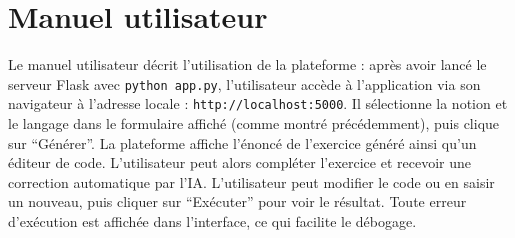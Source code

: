 \documentclass[a4paper, 12pt, twoside]{article}
\begin{document}
	\section{Manuel utilisateur}
Le manuel utilisateur décrit l'utilisation de la plateforme : après avoir lancé le serveur Flask avec \texttt{python app.py}, l'utilisateur accède à l'application via son navigateur à l'adresse locale : \texttt{http://localhost:5000}. Il sélectionne la notion et le langage dans le formulaire affiché (comme montré précédemment), puis clique sur ``Générer''. La plateforme affiche l'énoncé de l'exercice généré ainsi qu'un éditeur de code. L'utilisateur peut alors compléter l'exercice et recevoir une correction automatique par l'IA. L'utilisateur peut modifier le code ou en saisir un nouveau, puis cliquer sur ``Exécuter'' pour voir le résultat. Toute erreur d'exécution est affichée dans l'interface, ce qui facilite le débogage.
\end{document}
